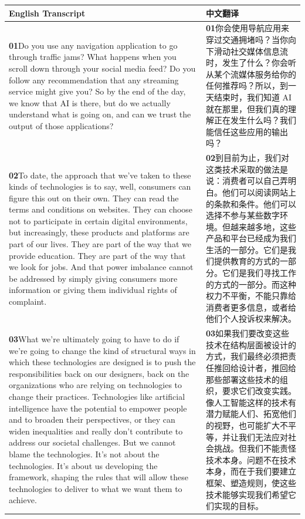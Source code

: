 \documentclass[UTF8,zihao=-4,fontset=fandol]{ctexart}
\newcommand{\TranscriptColumn}{\raggedright\arraybackslash\hyphenpenalty=10000\exhyphenpenalty=10000\sloppy}
\begin{document}
\renewcommand{\arraystretch}{1.23}
\begin{longtable}{>{\TranscriptColumn}p{} >{\TranscriptColumn}p{}}
\rowcolor{headerBg}\textbf{English Transcript} & \textbf{中文翻译} \\ \hline
\textbf{01}\quad Do you use any navigation application to go through traffic jams? What happens when you scroll down through your social media feed? Do you follow any recommendation that any streaming service might give you? So by the end of the day, we know that AI is there, but do we actually understand what is going on, and can we trust the output of those applications? & \textbf{01}\quad 你会使用导航应用来穿过交通拥堵吗？当你向下滑动社交媒体信息流时，发生了什么？你会听从某个流媒体服务给你的任何推荐吗？所以，到一天结束时，我们知道 AI 就在那里，但我们真的理解正在发生什么吗？我们能信任这些应用的输出吗？ \\ \hline
\textbf{02}\quad To date, the approach that we've taken to these kinds of technologies is to say, well, consumers can figure this out on their own. They can read the terms and conditions on websites. They can choose not to participate in certain digital environments, but increasingly, these products and platforms are part of our lives. They are part of the way that we provide education. They are part of the way that we look for jobs. And that power imbalance cannot be addressed by simply giving consumers more information or giving them individual rights of complaint. & \textbf{02}\quad 到目前为止，我们对这类技术采取的做法是说：消费者可以自己弄明白。他们可以阅读网站上的条款和条件。他们可以选择不参与某些数字环境。但越来越多地，这些产品和平台已经成为我们生活的一部分。它们是我们提供教育的方式的一部分。它们是我们寻找工作的方式的一部分。而这种权力不平衡，不能只靠给消费者更多信息，或者给他们个人投诉权来解决。 \\ \hline
\textbf{03}\quad What we're ultimately going to have to do if we're going to change the kind of structural ways in which these technologies are designed is to push the responsibilities back on our designers, back on the organizations who are relying on technologies to change their practices. Technologies like artificial intelligence have the potential to empower people and to broaden their perspectives, or they can widen inequalities and really don't contribute to address our societal challenges. But we cannot blame the technologies. It's not about the technologies. It's about us developing the framework, shaping the rules that will allow these technologies to deliver to what we want them to achieve. & \textbf{03}\quad 如果我们要改变这些技术在结构层面被设计的方式，我们最终必须把责任推回给设计者，推回给那些部署这些技术的组织，要求它们改变实践。像人工智能这样的技术有潜力赋能人们、拓宽他们的视野，也可能扩大不平等，并让我们无法应对社会挑战。但我们不能责怪技术本身。问题不在技术本身，而在于我们要建立框架、塑造规则，使这些技术能够实现我们希望它们实现的目标。 \\ \hline

\end{longtable}
\end{document}
